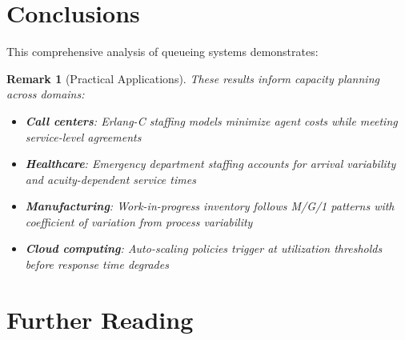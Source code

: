 \documentclass[a4paper, 11pt]{article}
\newtheorem{remark}{Remark}[section]
\begin{document}
\section{Conclusions}

This comprehensive analysis of queueing systems demonstrates:

\begin{remark}[Practical Applications]
These results inform capacity planning across domains:
\begin{itemize}
\item \textbf{Call centers}: Erlang-C staffing models minimize agent costs while meeting service-level agreements
\item \textbf{Healthcare}: Emergency department staffing accounts for arrival variability and acuity-dependent service times
\item \textbf{Manufacturing}: Work-in-progress inventory follows M/G/1 patterns with coefficient of variation from process variability
\item \textbf{Cloud computing}: Auto-scaling policies trigger at utilization thresholds before response time degrades
\end{itemize}
\end{remark}

\section*{Further Reading}
\end{document}

